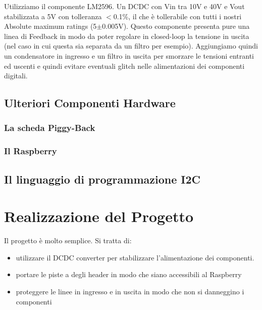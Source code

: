 \documentclass[10pt]{article}
\begin{document}
		Utilizziamo il componente LM2596. Un DCDC con Vin tra 10V e 40V e Vout stabilizzata a 5V con tolleranza \(<\)0.1\%, il che è tollerabile con tutti i nostri Absolute maximum ratings (5\(\pm\)0.005V).
		Questo componente presenta pure una linea di Feedback in modo da poter regolare in closed-loop la tensione in uscita (nel caso in cui questa sia separata da un filtro per esempio).
		Aggiungiamo quindi un condensatore in ingresso e un filtro in uscita per smorzare le tensioni entranti ed uscenti e quindi evitare eventuali glitch nelle alimentazioni dei componenti digitali.

	\subsection{Ulteriori Componenti Hardware}
		\subsubsection{La scheda Piggy-Back}\label{sec:piggy}

		\subsubsection{Il Raspberry}\label{sec:rasp}

	\subsection{Il linguaggio di programmazione I2C}\label{sec:i2c}

\section{Realizzazione del Progetto}
		Il progetto è molto semplice. Si tratta di:
		\begin{itemize}
		        \item utilizzare il DCDC converter per stabilizzare l'alimentazione dei componenti.
		        \item portare le piste a degli header in modo che siano accessibili al Raspberry
		        \item proteggere le linee in ingresso e in uscita in modo che non si danneggino i componenti
		\end{itemize}
\end{document}
